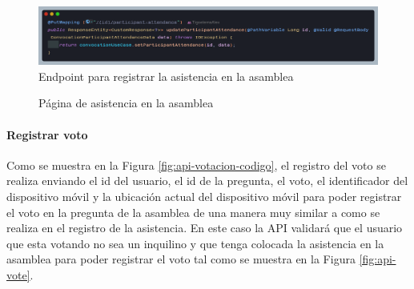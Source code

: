 \begin{figure}[H]
    \centering
    \includegraphics[width=1\textwidth]{resources/images/api-asistencia}
    \caption{Endpoint para registrar la asistencia en la asamblea}
    \label{fig:api-asistencia}
\end{figure}

\begin{figure}[H]
    \centering
    \caption{Página de asistencia en la asamblea}
    \label{fig:app-asistencia}
\end{figure}

\paragraph{Registrar voto}

Como se muestra en la Figura \ref{fig:api-votacion-codigo}, el registro del voto se realiza enviando el id del usuario, el id de la pregunta, el voto, el identificador del dispositivo móvil y la ubicación actual del dispositivo móvil para poder registrar el voto en la pregunta de la asamblea de una manera muy similar a como se realiza en el registro de la asistencia.
En este caso la API validará que el usuario que esta votando no sea un inquilino y que tenga colocada la asistencia en la asamblea para poder registrar el voto tal como se muestra en la Figura \ref{fig:api-vote}.

